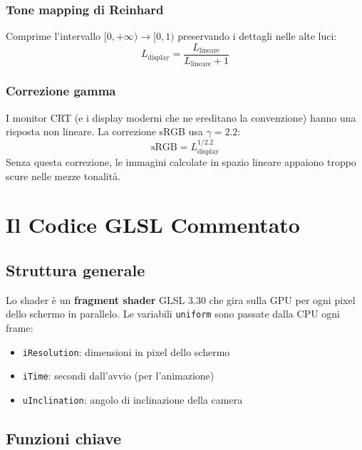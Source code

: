 \documentclass[12pt, a4paper, twoside]{article}
\theoremstyle{definition}
\begin{document}
\subsubsection{Tone mapping di Reinhard}

Comprime l'intervallo $[0, +\infty) \to [0, 1)$ preservando i dettagli nelle
alte luci:
\begin{equation}
  L_{\text{display}} = \frac{L_{\text{lineare}}}{L_{\text{lineare}} + 1}
\end{equation}

\subsubsection{Correzione gamma}

I monitor CRT (e i display moderni che ne ereditano la convenzione) hanno
una risposta non lineare. La correzione sRGB usa $\gamma = 2.2$:
\begin{equation}
  \text{sRGB} = L_{\text{display}}^{1/2.2}
\end{equation}
Senza questa correzione, le immagini calcolate in spazio lineare appaiono
troppo scure nelle mezze tonalità.

\newpage

\section{Il Codice GLSL Commentato}

\subsection{Struttura generale}

Lo shader è un \textbf{fragment shader} GLSL 3.30 che gira sulla GPU per ogni
pixel dello schermo in parallelo. Le variabili \texttt{uniform} sono passate
dalla CPU ogni frame:

\begin{itemize}
  \item \texttt{iResolution}: dimensioni in pixel dello schermo
  \item \texttt{iTime}: secondi dall'avvio (per l'animazione)
  \item \texttt{uInclination}: angolo di inclinazione della camera
\end{itemize}

\subsection{Funzioni chiave}
\end{document}
